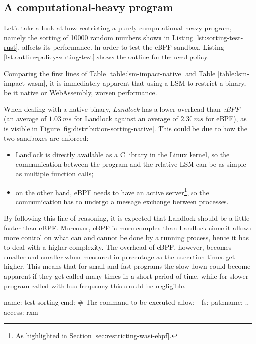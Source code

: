 \subsection{A computational-heavy program}

Let's take a look at how restricting a purely computational-heavy program, namely the sorting of 
10000 random numbers shown in Listing \ref{lst:sorting-test-rust}, affects its performance.
In order to test the eBPF sandbox, Listing \ref{lst:outline-policy-sorting-test} shows the outline for the used policy.

Comparing the first lines of Table \ref{table:lsm-impact-native} and Table \ref{table:lsm-impact-wasm},
it is immediately apparent that using a LSM to restrict a binary, be it native or WebAssembly, worsen performance.

When dealing with a native binary, \textit{Landlock} has a lower overhead than \textit{eBPF} (an average
of $1.03\ ms$ for Landlock against an average of $2.30\ ms$ for eBPF), as is visible in Figure \ref{fig:distribution-sorting-native}.
This could be due to how the two sandboxes are enforced:
\begin{itemize}
  \item Landlock is directly available as a C library in the Linux kernel, so the communication between
        the program and the relative LSM can be as simple as multiple function calls;
  \item on the other hand, eBPF needs to have an active server\footnote{As highlighted in Section \ref{sec:restricting-wasi-ebpf}.},
        so the communication has to undergo a message exchange between processes.
\end{itemize}
By following this line of reasoning, it is expected that Landlock should be a little faster than eBPF.
Moreover, eBPF is more complex than Landlock since it allows more control on what
can and cannot be done by a running process, hence it has to deal with a higher complexity.
The overhead of eBPF, however, becomes smaller and smaller when measured in percentage as the execution times get higher.
This means that for small and fast programs the slow-down could become apparent if they get called many times
in a short period of time, while for slower program called with less frequency this should be negligible.

\vspace*{0.5cm}
\begin{code}[language=yaml, caption=The outline of the policy used for testing the sorting program., label=lst:outline-policy-sorting-test]
name: test-sorting
cmd: # The command to be executed
allow:
- fs: {pathname: ., access: rxm}
\end{code}

